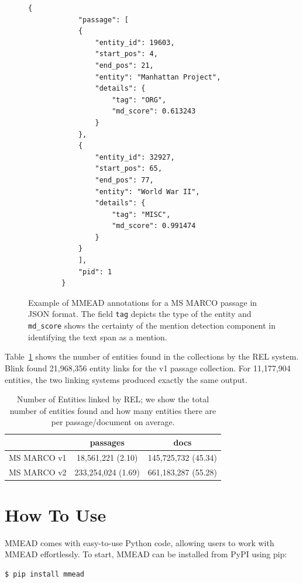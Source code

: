 \begin{figure}[t]
	\begin{lstlisting}[frame=single, numbers=none]
		{
			"passage": [
			{
				"entity_id": 19603, 
				"start_pos": 4, 
				"end_pos": 21,
				"entity": "Manhattan Project",
				"details": {
					"tag": "ORG",
					"md_score": 0.613243
				}
			}, 
			{
				"entity_id": 32927,
				"start_pos": 65,
				"end_pos": 77,
				"entity": "World War II",
				"details": {
					"tag": "MISC",
					"md_score": 0.991474
				}
			}
			], 
			"pid": 1
		}
	\end{lstlisting}
\caption{Example of MMEAD annotations for a MS MARCO passage in JSON format. The field \texttt{tag} depicts the type of the entity and \texttt{md\_score} shows the certainty of the mention detection component in identifying the text span as a mention.}
\label{fig:json-example-passage-v1}
\end{figure}

Table~\ref{number-links} shows the number of entities found in the collections by the REL system. Blink found 21,968,356 entity links for the v1 passage collection.  For 11,177,904 entities, the two linking systems produced exactly the same output. 

\begin{table}[t]
\centering
\caption{Number of Entities linked by REL; we show the total number of entities found and how many entities there are per passage/document on average.}
\begin{tabular}{c|c|c}
	\toprule
	& passages & docs \\
	\midrule
	MS MARCO v1 & 18,561,221 (2.10) & 145,725,732 (45.34) \\
	MS MARCO v2 & 233,254,024 (1.69) & 661,183,287 (55.28) \\
	\bottomrule
\end{tabular}
\label{number-links}
\end{table}

\section{How To Use}

MMEAD comes with easy-to-use Python code, allowing users to work with MMEAD effortlessly. To start, MMEAD can be installed from PyPI using pip:

\begin{verbatim}
$ pip install mmead
\end{verbatim}

